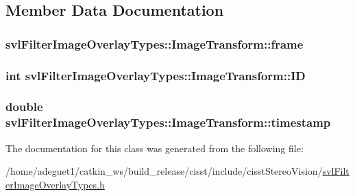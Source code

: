 \subsection{Member Data Documentation}
\hypertarget{classsvl_filter_image_overlay_types_1_1_image_transform_acb473a9569970f365a0147ded7cd6bcc}{
\subsubsection[{frame}]{ svl\-Filter\-Image\-Overlay\-Types\-::\-Image\-Transform\-::frame}}\label{classsvl_filter_image_overlay_types_1_1_image_transform_acb473a9569970f365a0147ded7cd6bcc}
\hypertarget{classsvl_filter_image_overlay_types_1_1_image_transform_a0a6dbf36d0e3934007a0af762bbc4942}{
\subsubsection[{I\-D}]{\setlength{\rightskip}{0pt plus 5cm}int svl\-Filter\-Image\-Overlay\-Types\-::\-Image\-Transform\-::\-I\-D}}\label{classsvl_filter_image_overlay_types_1_1_image_transform_a0a6dbf36d0e3934007a0af762bbc4942}
\hypertarget{classsvl_filter_image_overlay_types_1_1_image_transform_aebc07597fe5d99cf5a2256e87f6f523c}{
\subsubsection[{timestamp}]{\setlength{\rightskip}{0pt plus 5cm}double svl\-Filter\-Image\-Overlay\-Types\-::\-Image\-Transform\-::timestamp}}\label{classsvl_filter_image_overlay_types_1_1_image_transform_aebc07597fe5d99cf5a2256e87f6f523c}


The documentation for this class was generated from the following file\-:\begin{DoxyCompactItemize}
\item 
/home/adeguet1/catkin\-\_\-ws/build\-\_\-release/cisst/include/cisst\-Stereo\-Vision/\hyperlink{svl_filter_image_overlay_types_8h}{svl\-Filter\-Image\-Overlay\-Types.\-h}\end{DoxyCompactItemize}
